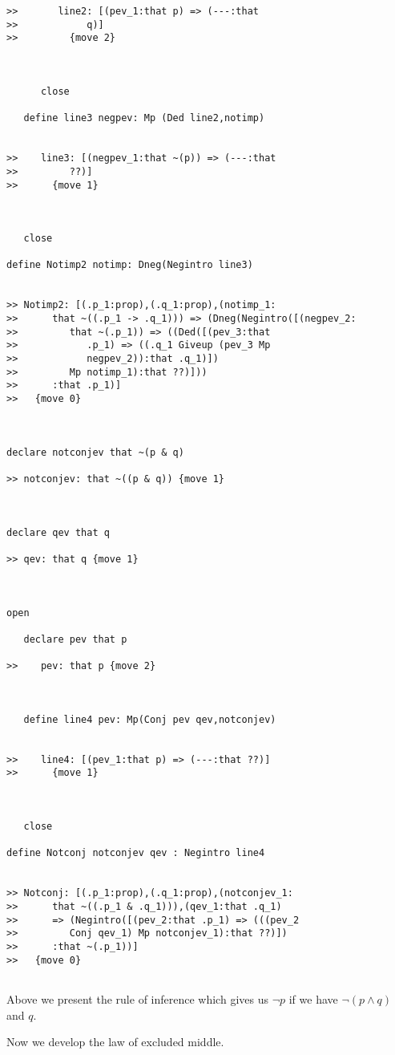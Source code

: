 \documentclass[12pt]{article}
\begin{document}
\begin{verbatim}
>>       line2: [(pev_1:that p) => (---:that
>>            q)]
>>         {move 2}



      close

   define line3 negpev: Mp (Ded line2,notimp)


>>    line3: [(negpev_1:that ~(p)) => (---:that
>>         ??)]
>>      {move 1}



   close

define Notimp2 notimp: Dneg(Negintro line3)


>> Notimp2: [(.p_1:prop),(.q_1:prop),(notimp_1:
>>      that ~((.p_1 -> .q_1))) => (Dneg(Negintro([(negpev_2:
>>         that ~(.p_1)) => ((Ded([(pev_3:that
>>            .p_1) => ((.q_1 Giveup (pev_3 Mp
>>            negpev_2)):that .q_1)])
>>         Mp notimp_1):that ??)]))
>>      :that .p_1)]
>>   {move 0}



declare notconjev that ~(p & q)

>> notconjev: that ~((p & q)) {move 1}



declare qev that q

>> qev: that q {move 1}



open

   declare pev that p

>>    pev: that p {move 2}



   define line4 pev: Mp(Conj pev qev,notconjev)


>>    line4: [(pev_1:that p) => (---:that ??)]
>>      {move 1}



   close

define Notconj notconjev qev : Negintro line4


>> Notconj: [(.p_1:prop),(.q_1:prop),(notconjev_1:
>>      that ~((.p_1 & .q_1))),(qev_1:that .q_1)
>>      => (Negintro([(pev_2:that .p_1) => (((pev_2
>>         Conj qev_1) Mp notconjev_1):that ??)])
>>      :that ~(.p_1))]
>>   {move 0}


\end{verbatim}

Above we present the rule of inference which gives us $\neg p$ if we have $\neg(p \wedge q)$ and $q$.

Now we develop the law of excluded middle.
\end{document}

